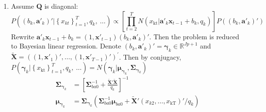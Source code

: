 \documentclass[]{article}
\begin{document}
\begin{enumerate}
	\item
	Assume \(\mathbf{Q}\) is diagonal:
	\[P\left( \left( b_{k},\mathbf{a}'_{k} \right)'|\left\{ x_{kt} \right\}_{t = 1}^{T},q_{k},\ \ldots \right) \propto \left\lbrack \prod_{t = 2}^{T}{N\left( x_{\text{kt}}|\mathbf{a}'_{k}\mathbf{x}_{t - 1} + b_{k},q_{k} \right)} \right\rbrack P\left( \left( b_{k},\mathbf{a}'_{k} \right)' \right)\]
	Rewrite \(\mathbf{a}'_{k}\mathbf{x}_{t - 1} + b_{k} = \left( 1,\mathbf{x}'_{t - 1} \right)\left( b_{k},\mathbf{a}'_{k} \right)'\). Then the problem is reduced to Bayesian linear regression. Denote \(\left( b_{k},\mathbf{a}'_{k} \right)' = \bm{\gamma}_{k} \in \mathbb{R}^{Jp + 1}\)
	and
	\(\widetilde{\mathbf{X}} = \left( \left( 1,\mathbf{x}'_{1} \right)',\ldots,\left( 1,\mathbf{x}'_{T - 1} \right)' \right)^{'}\). Then by conjugacy, \(P\left( \bm{\gamma}_{k}|\left\{ x_{\text{kt}} \right\}_{t = 1}^{T},q_{k},\ \ldots \right) = N\left( \bm{\gamma}_{k}|\bm{\mu}_{\bm{\gamma}_{k}},\mathbf{\Sigma}_{\bm{\gamma}_{k}} \right)\)
	\begin{align*}
		\mathbf{\Sigma}_{\bm{\gamma}_{k}} &= \left\lbrack \mathbf{\Sigma}_{ba0}^{- 1} + \frac{{\widetilde{\mathbf{X}}'}\widetilde{\mathbf{X}}}{q_{k}} \right\rbrack^{- 1}\\
		\bm{\mu}_{\bm{\gamma}_{k}} &= \mathbf{\Sigma}_{\mathbf{\gamma}_{k}}\left( \mathbf{\Sigma}_{ba0}^{- 1}\mathbf{\mu}_{ba0} + {\widetilde{\mathbf{X}}'}\left( x_{k2},\ldots,x_{\text{kT}} \right)'/q_{k} \right)
	\end{align*}	
\end{enumerate}
\end{document}
